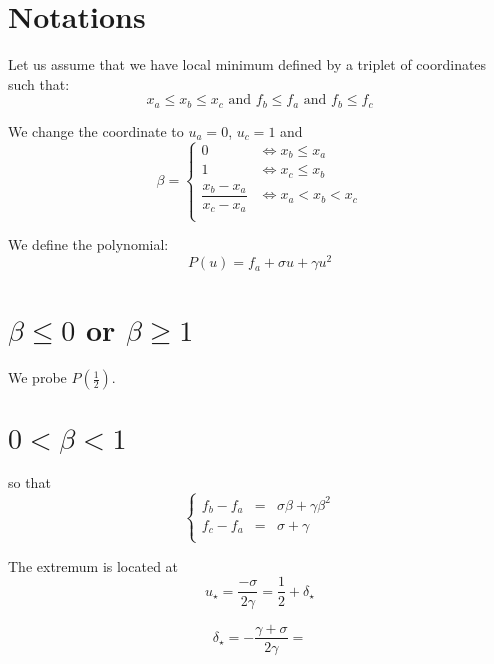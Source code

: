 \documentclass[aps,12pt]{revtex4}
\begin{document}
\section{Notations}
Let us assume that we have local minimum defined by a triplet of coordinates such that:
\begin{equation}
	x_a \leq x_b \leq x_c \text{ and } f_b \leq f_a \text{ and } f_b \leq f_c
\end{equation}

We change the coordinate to $u_a=0$, $u_c=1$ and
\begin{equation}
	\beta = \left\lbrace
	\begin{array}{cc}
	0 & \iff  x_b\leq x_a\\
	1 & \iff  x_c\leq x_b\\
	\dfrac{x_b-x_a}{x_c-x_a} & \iff x_a < x_b < x_c\\
	\end{array}
	\right.
\end{equation}

We define the polynomial:
\begin{equation}
	P(u) = f_a + \sigma u + \gamma u^2
\end{equation}

\section{$\beta\leq0$ or $\beta\geq1$}

We probe $P(\frac{1}{2})$.

\section{$0<\beta<1$}
so that
\begin{equation}
\left\lbrace
\begin{array}{rcl}
	f_b - f_a & = & \sigma \beta + \gamma \beta^2\\
	f_c - f_a & = & \sigma + \gamma\\
\end{array}
\right.
\end{equation}

The extremum is located at
\begin{equation}
	{u_\star} = \dfrac{-\sigma}{2\gamma} = \dfrac{1}{2} + \delta_\star
\end{equation}

\begin{equation}
	\delta_\star = -\dfrac{\gamma+\sigma}{2\gamma} = 
\end{equation}
\end{document}
